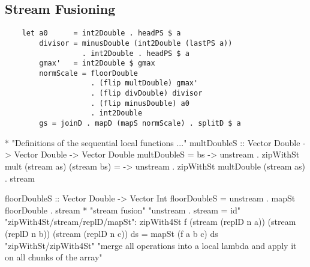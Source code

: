       
    \subsection{Stream Fusioning}
      \begin{lstlisting}
    let a0      = int2Double . headPS $ a 
        divisor = minusDouble (int2Double (lastPS a))
                  . int2Double . headPS $ a
        gmax'   = int2Double $ gmax
        normScale = floorDouble
                    . (flip multDouble) gmax'
                    . (flip divDouble) divisor
                    . (flip minusDouble) a0
                    . int2Double
        gs = joinD . mapD (mapS normScale) . splitD $ a
       \end{lstlisting}
       
       * "Definitions of the sequential local functions ..."
            multDoubleS :: Vector Double -> Vector Double -> Vector Double
            multDoubleS = \as bs -> unstream . zipWithSt mult (stream as) (stream bs)
              = \as -> unstream . zipWithSt multDouble (stream as) . stream

            floorDoubleS :: Vector Double -> Vector Int
            floorDoubleS = unstream . mapSt floorDouble . stream
       * "stream fusion"
           "unstream . stream = id"
           "zipWith4St/stream/replD/mapSt": zipWith4St f (stream (replD n a)) (stream (replD n b)) (stream (replD n c)) ds = mapSt (f a b c) ds
           "zipWithSt/zipWith4St"
           "merge all operations into a local lambda and apply it on all chunks of the array"
           
